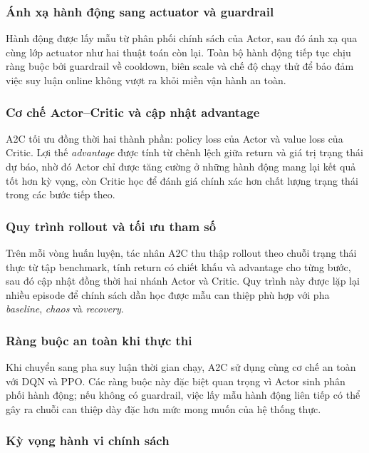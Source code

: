 \subsubsection{Ánh xạ hành động sang actuator và guardrail}

\noindent Hành động được lấy mẫu từ phân phối chính sách của Actor, sau đó ánh xạ qua cùng lớp actuator như hai thuật toán còn lại. Toàn bộ hành động tiếp tục chịu ràng buộc bởi guardrail về cooldown, biên scale và chế độ chạy thử để bảo đảm việc suy luận online không vượt ra khỏi miền vận hành an toàn.

\subsubsection{Cơ chế Actor--Critic và cập nhật advantage}

\noindent A2C tối ưu đồng thời hai thành phần: policy loss của Actor và value loss của Critic. Lợi thế \textit{advantage} được tính từ chênh lệch giữa return và giá trị trạng thái dự báo, nhờ đó Actor chỉ được tăng cường ở những hành động mang lại kết quả tốt hơn kỳ vọng, còn Critic học để đánh giá chính xác hơn chất lượng trạng thái trong các bước tiếp theo.

\subsubsection{Quy trình rollout và tối ưu tham số}

\noindent Trên mỗi vòng huấn luyện, tác nhân A2C thu thập rollout theo chuỗi trạng thái thực từ tập benchmark, tính return có chiết khấu và advantage cho từng bước, sau đó cập nhật đồng thời hai nhánh Actor và Critic. Quy trình này được lặp lại nhiều episode để chính sách dần học được mẫu can thiệp phù hợp với pha \textit{baseline}, \textit{chaos} và \textit{recovery}.

\subsubsection{Ràng buộc an toàn khi thực thi}

\noindent Khi chuyển sang pha suy luận thời gian chạy, A2C sử dụng cùng cơ chế an toàn với DQN và PPO. Các ràng buộc này đặc biệt quan trọng vì Actor sinh phân phối hành động; nếu không có guardrail, việc lấy mẫu hành động liên tiếp có thể gây ra chuỗi can thiệp dày đặc hơn mức mong muốn của hệ thống thực.

\subsubsection{Kỳ vọng hành vi chính sách}

